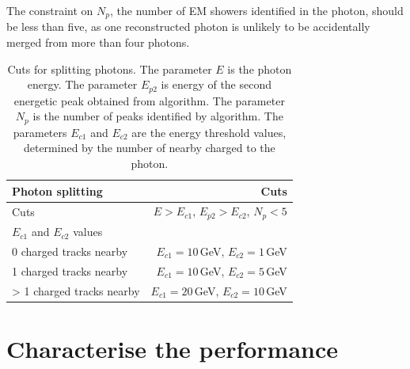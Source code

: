 
The constraint on $N_{p}$, the number of EM showers identified in the photon, should be less than five, as one reconstructed photon is unlikely to be accidentally merged from more than four photons.


\begin{table}[htbp]
\centering
\smallskip
\begin{tabular}{l r }
\hline
\hline
Photon splitting&  Cuts\\
\hline
\multicolumn{1}{L{0.3\textwidth}}{Cuts} & \multicolumn{1}{R{0.6\textwidth}}{$E > E_{c1}$, $E_{p2} > E_{c2}$, $N_{p} < 5$} \\
\hline
$E_{c1}$ and $E_{c2}$ values &  \\
\hline
\multicolumn{1}{L{0.3\textwidth}}{0 charged tracks nearby} & \multicolumn{1}{R{0.6\textwidth}}{$E_{c1} = 10$\,GeV, $E_{c2} = 1$\,GeV} \\
\multicolumn{1}{L{0.3\textwidth}}{1 charged tracks nearby} & \multicolumn{1}{R{0.6\textwidth}}{$E_{c1} = 10$\,GeV, $E_{c2} = 5$\,GeV} \\
\multicolumn{1}{L{0.3\textwidth}}{> 1 charged tracks nearby} & \multicolumn{1}{R{0.6\textwidth}}{$E_{c1} = 20$\,GeV, $E_{c2} = 10$\,GeV} \\
\hline
\hline
\end{tabular}

\caption[Cuts for splitting photons.]%
{Cuts for splitting photons. The parameter $E$ is the photon energy. The parameter $E_{p2}$ is  energy of the second energetic peak obtained from \peakFinding algorithm. The parameter $N_{p}$ is the number of peaks identified by \peakFinding algorithm. The parameters $E_{c1}$ and $E_{c2}$ are the energy threshold values, determined by the number of nearby charged  to the photon.}
\label{tab:photonPhotonSplitting}
\end{table}

\section{Characterise the performance}




